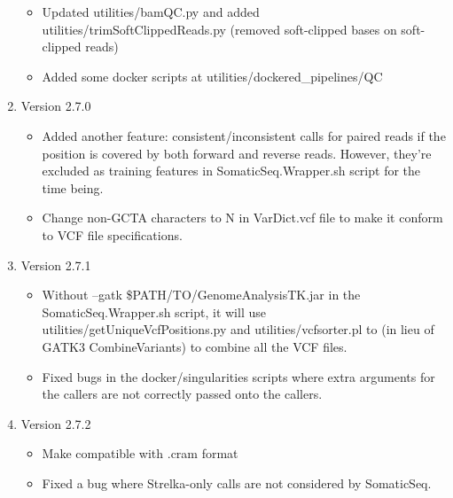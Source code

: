 \documentclass[10pt,letterpaper]{article}
\begin{document}
\begin{sloppypar}
\begin{enumerate}
\begin{itemize}
		  \item
		  Updated utilities/bamQC.py and added utilities/trimSoftClippedReads.py (removed soft-clipped bases on soft-clipped reads)
		  
		  \item
		  Added some docker scripts at utilities/dockered\_pipelines/QC
		
		\end{itemize}
	
	
	
	\item Version 2.7.0
	
		\begin{itemize}
		  \item
		  Added another feature: consistent/inconsistent calls for paired reads if the position is covered by both forward and reverse reads. However, they're excluded as training features in SomaticSeq.Wrapper.sh script for the time being. 
		  
		  \item
		  Change non-GCTA characters to N in VarDict.vcf file to make it conform to VCF file specifications. 
		
		\end{itemize}
		
		
		\item Version 2.7.1
		
		\begin{itemize}
		
		  \item
		  Without --gatk \$PATH/TO/GenomeAnalysisTK.jar in the SomaticSeq.Wrapper.sh script, it will use utilities/getUniqueVcfPositions.py and utilities/vcfsorter.pl to (in lieu of GATK3 CombineVariants) to combine all the VCF files. 
		
		  \item
		  Fixed bugs in the docker/singularities scripts where extra arguments for the callers are not correctly passed onto the callers. 
		
		\end{itemize}
	
	
	
	\item Version 2.7.2
	
		\begin{itemize}
		
		  \item
		  Make compatible with .cram format
		  
		  \item
		  Fixed a bug where Strelka-only calls are not considered by SomaticSeq. 
		  

\end{itemize}
\end{enumerate}
\end{sloppypar}
\end{document}
